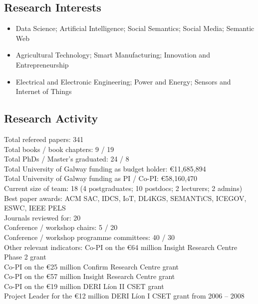 \documentclass[10pt,a4paper]{res} %
\begin{document}
\begin{resume}
\subsection*{Research Interests}

\begin{itemize} \itemsep -2pt
\item Data Science; Artificial Intelligence; Social Semantics; Social Media; Semantic Web
\item Agricultural Technology; Smart Manufacturing; Innovation and Entrepreneurship
\item Electrical and Electronic Engineering; Power and Energy; Sensors and Internet of Things
\end{itemize}

\subsection*{Research Activity}

\begin{center}
Total refereed papers: \hfill 341 \\
Total books / book chapters: \hfill 9 / 19 \\
Total PhDs / Master's graduated: \hfill 24 / 8 \\
Total University of Galway funding as budget holder: \hfill \euro{}11,685,894 \\
Total University of Galway funding as PI / Co-PI: \hfill \euro{}58,160,470 \\
Current size of team: \hfill 18 (4 postgraduates; 10 postdocs; 2 lecturers; 2 admins) \\
Best paper awards: \hfill ACM SAC, IDCS, IoT, DL4KGS, SEMANTiCS, ICEGOV, ESWC, IEEE PELS \\
Journals reviewed for: \hfill 20 \\
Conference / workshop chairs: \hfill 5 / 20 \\
Conference / workshop programme committees: \hfill 40 / 30 \\
Other relevant indicators: \hfill Co-PI on the \euro{}64 million Insight Research Centre Phase 2 grant \\ \hfill Co-PI on the \euro{}25 million Confirm Research Centre grant \\ \hfill Co-PI on the \euro{}57 million Insight Research Centre grant \\ \hfill Co-PI on the \euro{}19 million DERI L\'{i}on II CSET grant \\ \hfill Project Leader for the \euro{}12 million DERI L\'{i}on I CSET grant from 2006 -- 2008
\end{center}


\end{resume}
\end{document}
